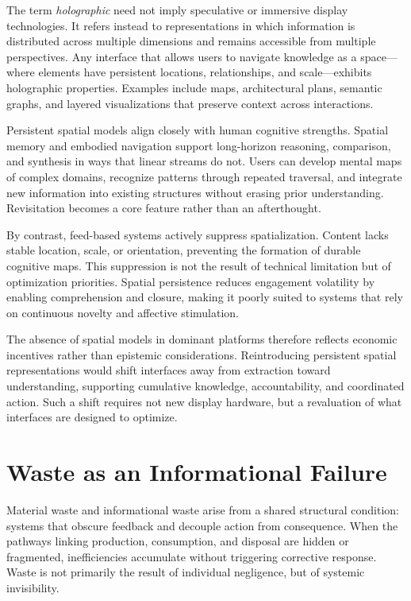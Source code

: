 \documentclass[12pt]{article}
\begin{document}
The term \emph{holographic} need not imply speculative or immersive display technologies. It refers instead to representations in which information is distributed across multiple dimensions and remains accessible from multiple perspectives. Any interface that allows users to navigate knowledge as a space—where elements have persistent locations, relationships, and scale—exhibits holographic properties. Examples include maps, architectural plans, semantic graphs, and layered visualizations that preserve context across interactions.

Persistent spatial models align closely with human cognitive strengths. Spatial memory and embodied navigation support long-horizon reasoning, comparison, and synthesis in ways that linear streams do not. Users can develop mental maps of complex domains, recognize patterns through repeated traversal, and integrate new information into existing structures without erasing prior understanding. Revisitation becomes a core feature rather than an afterthought.

By contrast, feed-based systems actively suppress spatialization. Content lacks stable location, scale, or orientation, preventing the formation of durable cognitive maps. This suppression is not the result of technical limitation but of optimization priorities. Spatial persistence reduces engagement volatility by enabling comprehension and closure, making it poorly suited to systems that rely on continuous novelty and affective stimulation.

The absence of spatial models in dominant platforms therefore reflects economic incentives rather than epistemic considerations. Reintroducing persistent spatial representations would shift interfaces away from extraction toward understanding, supporting cumulative knowledge, accountability, and coordinated action. Such a shift requires not new display hardware, but a revaluation of what interfaces are designed to optimize.

\section{Waste as an Informational Failure}

Material waste and informational waste arise from a shared structural condition: systems that obscure feedback and decouple action from consequence. When the pathways linking production, consumption, and disposal are hidden or fragmented, inefficiencies accumulate without triggering corrective response. Waste is not primarily the result of individual negligence, but of systemic invisibility.
\end{document}

